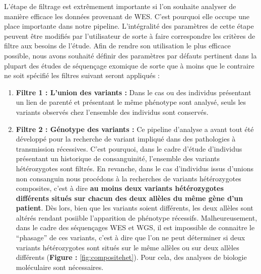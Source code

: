 \documentclass[12pt,twoside]{reedthesis}
\theoremstyle{definition}
\theoremstyle{definition}
\theoremstyle{remark}
\begin{document}
  L'étape de filtrage est extrêmement importante si l'on souhaite analyser
  de manière efficace les données provenant de WES. C'est pourquoi elle
  occupe une place importante dans notre pipeline. L'intégralité des
  paramètres de cette étape peuvent être modifiés par l'utilisateur de
  sorte à faire correspondre les critères de filtre aux besoins de
  l'étude. Afin de rendre son utilisation le plus efficace possible, nous
  avons souhaité définir des paramètres par défauts pertinent dans la
  plupart des études de séquençage exomique de sorte que à moins que le
  contraire ne soit spécifié les filtres suivant seront appliqués :
  
  \begin{enumerate}
  \def\labelenumi{\arabic{enumi}.}
  \item
    \textbf{Filtre 1 : L'union des variants :} Dans le cas ou des
    individus présentant un lien de parenté et présentant le même
    phénotype sont analysé, seuls les variants observés chez l'ensemble
    des individus sont conservés.
  \item
    \textbf{Filtre 2 : Génotype des variants :} Ce pipeline d'analyse a
    avant tout été développé pour la recherche de variant impliqué dans
    des pathologies à transmission récessives. C'est pourquoi, dans le
    cadre d'étude d'individus présentant un historique de consanguinité,
    l'ensemble des variants hétérozygotes sont filtrés. En revanche, dans
    le cas d'individus issus d'unions non consanguin nous procédons à la
    recherches de variants hétérozygotes composites, c'est à dire
    \textbf{au moins deux variants hétérozygotes différents situés sur
    chacun des deux allèles du même gène d'un patient}. Dès lors, bien que
    les variants soient différents, les deux allèles sont altérés rendant
    posiible l'apparition de phénotype récessifs. Malheureusement, dans le
    cadre des séquençages WES et WGS, il est impossible de connaitre le
    ``phasage'' de ces variants, c'est à dire que l'on ne peut déterminer
    si deux variants hétérozygotes sont situés sur le même allèles ou sur
    deux allèles différents (\textbf{Figure : }\ref{fig:compositehet}).
    Pour cela, des analyses de biologie moléculaire sont nécessaires.
  \end{enumerate}
  
  \newpage
  
\end{document}
